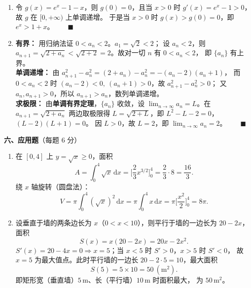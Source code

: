 \documentclass[12pt]{ctexart}
\begin{document}
\begin{enumerate}[label=\textbf{\arabic*.},itemsep=12pt]
\item 令 $g(x)=e^{x}-1-x$，则 $g(0)=0$，且当 $x>0$ 时
  $g'(x)=e^{x}-1>0$，故 $g$ 在 $[0,+\infty)$ 上单调递增。
  于是当 $x>0$ 时 $g(x)>g(0)=0$，即 $e^{x}>1+x$。$\qquad\blacksquare$

\item \textbf{有界：} 用归纳法证 $0<a_{n}<2$。$a_{1}=\sqrt2<2$；
  设 $a_{n}<2$，则 $a_{n+1}=\sqrt{2+a_{n}}<\sqrt{2+2}=2$。故对一切 $n$ 有 $0<a_{n}<2$，
  即 $\{a_{n}\}$ 有上界。\\[2pt]
  \textbf{单调递增：} 由
  $a_{n+1}^{2}-a_{n}^{2}=(2+a_{n})-a_{n}^{2}=-(a_{n}-2)(a_{n}+1)$，
  而 $0<a_{n}<2$ 时 $(a_{n}-2)<0,\ (a_{n}+1)>0$，故 $a_{n+1}^{2}-a_{n}^{2}>0$；
  又 $a_{n},a_{n+1}>0$，所以 $a_{n+1}>a_{n}$，数列单调递增。\\[2pt]
  \textbf{求极限：} 由\textbf{单调有界定理}，$\{a_{n}\}$ 收敛，设
  $\displaystyle\lim_{n\to\infty}a_{n}=L$。在 $a_{n+1}=\sqrt{2+a_{n}}$ 两边取极限得
  $L=\sqrt{2+L}$，即 $L^{2}-L-2=0$，$(L-2)(L+1)=0$。
  因 $L>0$，故 $L=2$，即 $\displaystyle\lim_{n\to\infty}a_{n}=2$。$\qquad\blacksquare$
\end{enumerate}

\vspace{6pt}
\noindent\textbf{六、应用题}（每题 6 分）

\begin{enumerate}[label=\textbf{\arabic*.},itemsep=12pt]
\item 在 $[0,4]$ 上 $y=\sqrt{x}\geq 0$，面积
  \[
  A=\int_{0}^{4}\sqrt{x}\,\mathrm{d}x=\Big[\frac23 x^{3/2}\Big]_{0}^{4}
  =\frac23\cdot 8=\frac{16}{3}.
  \]
  绕 $x$ 轴旋转（圆盘法）：
  \[
  V=\pi\int_{0}^{4}(\sqrt{x})^{2}\,\mathrm{d}x=\pi\int_{0}^{4}x\,\mathrm{d}x
  =\pi\Big[\frac{x^{2}}{2}\Big]_{0}^{4}=8\pi.
  \]

\item 设垂直于墙的两条边长为 $x$（$0<x<10$），则平行于墙的一边长为 $20-2x$，
  面积
  \[
  S(x)=x(20-2x)=20x-2x^{2}.
  \]
  $S'(x)=20-4x=0\Rightarrow x=5$；当 $x<5$ 时 $S'>0$，$x>5$ 时 $S'<0$，
  故 $x=5$ 为最大值点。此时平行墙的一边长 $20-2\cdot5=10$，最大面积
  \[
  S(5)=5\times 10=50\ (\mathrm{m}^{2}).
  \]
  即矩形宽（垂直墙）$5\,\mathrm{m}$、长（平行墙）$10\,\mathrm{m}$ 时面积最大，
  为 $50\,\mathrm{m}^{2}$。
\end{enumerate}
\end{document}
